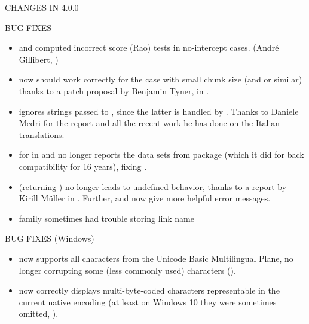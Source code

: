 \documentclass[letterpaper]{book}
\begin{document}
\begin{Section}{ CHANGES IN 4.0.0}
\begin{SubSection}{BUG FIXES}
\begin{itemize}
\item{}  and  computed
incorrect score (Rao) tests in no-intercept cases. (André
Gillibert, )

\item{}  now should work correctly for the
 case with small chunk size (and
 or similar) thanks to a patch proposal by Benjamin
Tyner, in .

\item{}  ignores strings passed to
, since the latter is handled by
. Thanks to Daniele Medri for the report and all
the recent work he has done on the Italian translations.

\item{}  for  in  and
 no longer reports the data sets from package
 (which it did for back compatibility for 16 years),
fixing .

\item{}  (returning ) no longer leads to
undefined behavior, thanks to a report by Kirill Müller in
.  Further,  and  now give
more helpful error messages.

\item{}  family sometimes had trouble storing
link name 

\end{itemize}


\end{SubSection}


%
\begin{SubSection}{BUG FIXES (Windows)}
\begin{itemize}

\item{}  now supports all characters
from the Unicode Basic Multilingual Plane, no longer corrupting
some (less commonly used) characters ().

\item{}  now correctly displays
multi-byte-coded characters representable in the current native
encoding (at least on Windows 10 they were sometimes omitted,
).


\end{itemize}
\end{SubSection}
\end{Section}
\end{document}
